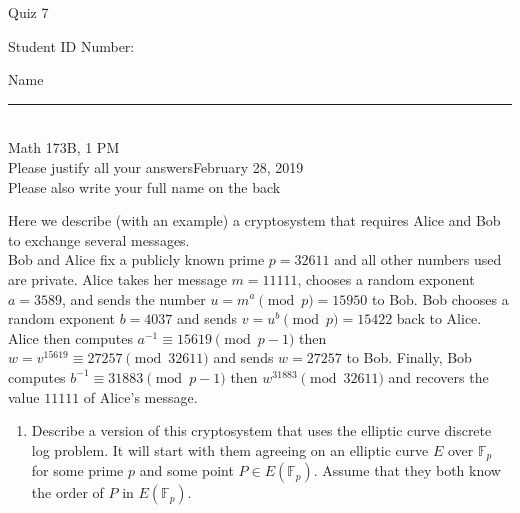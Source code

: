 \documentclass[12pt]{article}
\begin{document}
\begin{flushleft} 
\centerline{\LARGE{Quiz 7}} 
\vspace{5 mm}
{Student ID Number:}\hfill  
{Name \rule {2 in}{0.01in}}\\
Math 173B, 1 PM
\\
{Please justify all your answers}\hfill {February 28, 2019}
\\
{Please also write your full name on the back} 

\medskip
\end{flushleft}

\noindent Here we describe (with an example) a cryptosystem that requires Alice and Bob to exchange several messages.\\
Bob and Alice fix a publicly known prime $p = 32611$ and all other numbers used are private. Alice takes her message $m = 11111$, chooses a random exponent $a = 3589$, and sends the number $u = m^a\pmod{p} = 15950$ to Bob. Bob chooses a random exponent $b = 4037$ and sends $v = u^b\pmod{p} = 15422$ back to Alice. Alice then computes $a^{-1} \equiv 15619 \pmod{p-1}$ then $w = v^{15619}\equiv 27257\pmod{32611}$ and sends $w = 27257$ to Bob. Finally, Bob computes $b^{-1} \equiv 31883 \pmod{p-1}$ then $w^{31883}\pmod{32611}$ and recovers the value $11111$ of Alice's message.\\
\begin{enumerate}
	\item Describe a version of this cryptosystem that uses the elliptic curve discrete log problem. It will start with them agreeing on an elliptic curve $E$ over $\mathbb{F}_p$ for some prime $p$ and some point $P\in E(\mathbb{F}_p)$. Assume that they both know the order of $P$ in $E(\mathbb{F}_p)$.
	\vfill
\end{enumerate}

\end{document}
